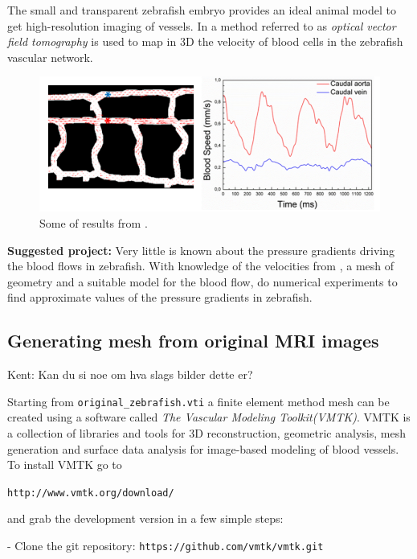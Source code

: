 \documentclass[epsfig,11pt]{article}
\begin{document}
The small and transparent zebrafish embryo provides an ideal animal model to get high-resolution imaging of vessels. In \cite{fieramonti2015quantitative} a method referred to as \emph{optical vector field tomography} is used to map in 3D the velocity of blood cells in the zebrafish vascular network. 

\begin{figure}[h!] 
\begin{center}
  \includegraphics[scale=0.5]{blood_velocities.png}
  \end{center}
  \caption{Some of results from \cite{fieramonti2015quantitative}.}
\end{figure}

\textbf{Suggested project:} Very little is known about the pressure gradients driving the blood flows in zebrafish. With knowledge of the velocities from \cite{fieramonti2015quantitative}, a mesh of geometry and a suitable model for the blood flow, do numerical experiments to find approximate values of the pressure gradients in zebrafish.

\subsection{Generating mesh from original MRI images}

{\color{red} Kent: Kan du si noe om hva slags bilder dette er?}

Starting from \texttt{original\_zebrafish.vti} a finite element method mesh can be created using a software called \emph{The Vascular Modeling Toolkit(VMTK)}. VMTK is a collection of libraries and tools for 3D reconstruction, geometric analysis, mesh generation and surface data analysis for image-based modeling of blood vessels. To install VMTK go to 

\texttt{http://www.vmtk.org/download/}

and grab the development version in a few simple steps:

- Clone the git repository: \texttt{https://github.com/vmtk/vmtk.git}
\end{document}

